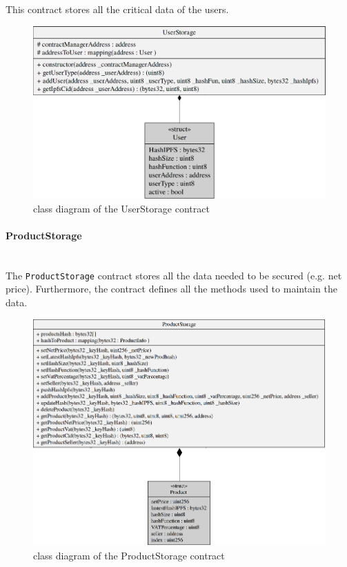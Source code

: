 \noindent This contract stores all the critical data of the users. 
\begin{figure}[H]
	\centering
	\includegraphics[scale=0.25]{res/images/solidity/userstorage.png}
	\caption{class diagram of the UserStorage contract}
\end{figure}
\pagebreak
\paragraph{ProductStorage}\mbox{}\\

\noindent The \texttt{ProductStorage} contract stores all the data needed to be secured (e.g. net price). Furthermore, the contract defines all the methods used to maintain the data. 
\begin{figure}[H]
	\centering
	\includegraphics[scale=0.45]{res/images/solidity/productstorage.png}
	\caption{class diagram of the ProductStorage contract}
\end{figure}
\pagebreak
